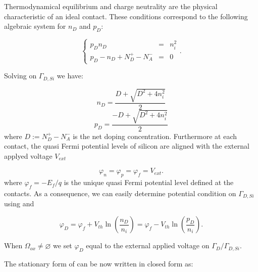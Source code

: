 Thermodynamical equilibrium and charge neutrality are the physical characteristic of an ideal contact. These conditions correspond to the following algebraic system for $n_D$ and $p_D$:

\begin{equation}
\label{eq: systemo for dirichlet condition}
\left\{
\begin{array}{lcl}
p_Dn_D & = &n_i^2 \\
p_D -n_D +N_D^+-N_A^- & = & 0 
\end{array}
\right. .
\end{equation}

Solving  on $\Gamma_{D,Si}$ we have:

\begin{equation}
n_D = \dfrac{D + \sqrt{D^2+4n_i^2}}{2}
\end{equation}
\begin{equation}
p_D = \dfrac{-D + \sqrt{D^2+4n_i^2}}{2}
\end{equation}
where $D := N_D^+ -N_A^-$ is the net doping concentration. Furthermore  at each contact, the quasi Fermi potential levels of silicon are aligned with the external applyed voltage $V_{ext}$

\begin{equation}
\varphi_n=\varphi_p=\varphi_f=V_{ext}.
\end{equation}
where $\varphi_f = - E_f / q$ is the unique quasi Fermi potential level defined at the contacts.
As a consequence, we can easily determine potential condition on $\Gamma_{D,Si}$ using  and 

\begin{equation}
\varphi_D = \varphi_f + V_{th}\ln\left( \dfrac{n_D}{n_i} \right) = \varphi_f - V_{th}\ln\left( \dfrac{p_D}{n_i} \right).
\end{equation}

 When $\Omega_{ox} \neq \varnothing$ we set $\varphi_D$ equal to the external applied voltage on $\Gamma_D / \Gamma_{D,Si}$.


The stationary form of  can be now written in closed form as:
 


